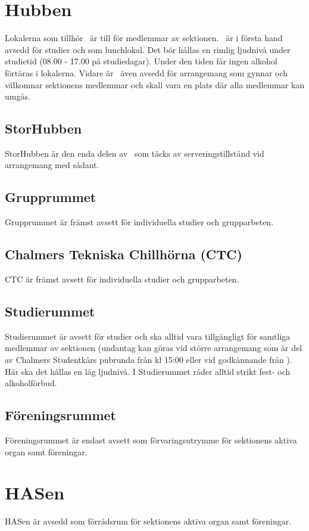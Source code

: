 \documentclass[11pt, includeaddress]{classes/cthit}
\begin{document}
\section{Hubben}
Lokalerna som tillhör \HUBBEN\ är till för medlemmar av sektionen. \HUBBEN\ är i första hand avsedd för
studier och som lunchlokal. Det bör hållas en rimlig ljudnivå under studietid (08.00­ - 17.00 på
studiedagar). Under den tiden får ingen alkohol förtäras i lokalerna. Vidare är \HUBBEN\ även avsedd för
arrangemang som gynnar och välkomnar sektionens medlemmar och skall vara en plats där alla
medlemmar kan umgås.

\subsection{StorHubben}
StorHubben är den enda delen av \HUBBEN\ som täcks av serveringstillstånd vid arrangemang med sådant.

\subsection{Grupprummet}
Grupprummet är främst avsett för individuella studier och grupparbeten.

\subsection{Chalmers Tekniska Chillhörna (CTC)}
CTC är främst avsett för individuella studier och grupparbeten.

\subsection{Studierummet}
Studierummet är avsett för studier och ska alltid vara tillgängligt för samtliga medlemmar av sektionen (undantag kan göras vid större arrangemang som är del av Chalmers Studentkårs pubrunda från kl 15:00 eller vid godkännande från \STYRIT{}). Här ska det hållas en låg ljudnivå.
\newline
I Studierummet råder alltid strikt fest- och alkoholförbud.

\subsection{Föreningsrummet}
Föreningsrummet är endast avsett som förvaringsutrymme för sektionens aktiva organ samt föreningar.


\section{HASen}
HASen är avsedd som förrådsrum för sektionens aktiva organ samt föreningar.
\end{document}
